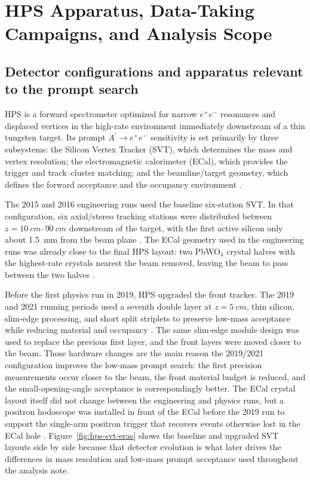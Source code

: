 \section{HPS Apparatus, Data-Taking Campaigns, and Analysis Scope}
\label{sec:datasets}

\subsection{Detector configurations and apparatus relevant to the prompt search}

HPS is a forward spectrometer optimized for narrow $e^+e^-$ resonances and displaced
vertices in the high-rate environment immediately downstream of a thin tungsten target.
Its prompt $A^\prime \rightarrow e^+e^-$ sensitivity is set primarily by three
subsystems: the Silicon Vertex Tracker (SVT), which determines the mass and vertex
resolution; the electromagnetic calorimeter (ECal), which provides the trigger and
track--cluster matching; and the beamline/target geometry, which defines the forward
acceptance and the occupancy environment \cite{HPSExperiment2022,HPS2016PromptLong}.

The 2015 and 2016 engineering runs used the baseline six-station SVT. In that
configuration, six axial/stereo tracking stations were distributed between
$z=\SIrange{10}{90}{cm}$ downstream of the target, with the first active silicon only
about \SI{1.5}{mm} from the beam plane \cite{HPS2016BumpInternal,HPSExperiment2022}.
The ECal geometry used in the engineering runs was already close to the final HPS
layout: two PbWO$_4$ crystal halves with the highest-rate crystals nearest the beam
removed, leaving the beam to pass between the two halves
\cite{HPS2016BumpInternal,HPSExperiment2022}.

Before the first physics run in 2019, HPS upgraded the front tracker. The 2019 and
2021 running periods used a seventh double layer at $z=\SI{5}{cm}$, thin silicon,
slim-edge processing, and short split striplets to preserve low-mass acceptance while
reducing material and occupancy \cite{HPSExperiment2022,HPSSlimEdgeSensors2020}. The
same slim-edge module design was used to replace the previous first layer, and the
front layers were moved closer to the beam. Those hardware changes are the main reason
the 2019/2021 configuration improves the low-mass prompt search: the first precision
measurements occur closer to the beam, the front material budget is reduced, and the
small-opening-angle acceptance is correspondingly better. The ECal crystal layout
itself did not change between the engineering and physics runs, but a positron
hodoscope was installed in front of the ECal before the 2019 run to support the
single-arm positron trigger that recovers events otherwise lost in the ECal hole
\cite{HPSExperiment2022}. Figure~\ref{fig:hps-svt-eras} shows the baseline and
upgraded SVT layouts side by side because that detector evolution is what later drives
the differences in mass resolution and low-mass prompt acceptance used throughout the
analysis note.


